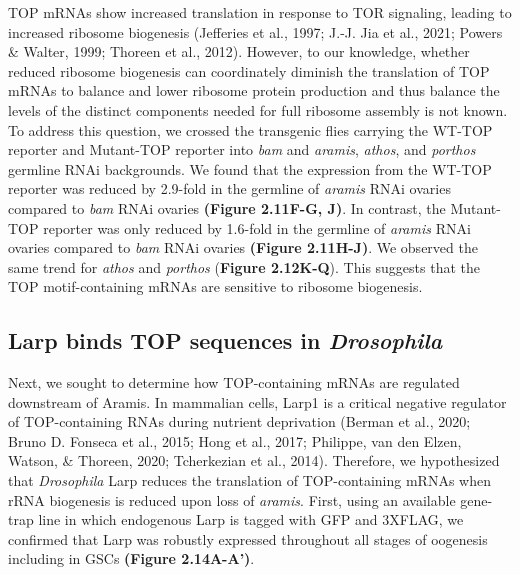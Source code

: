 \documentclass[12pt,oneside]{reedthesis}
\begin{document}
TOP mRNAs show increased translation in response to TOR signaling,
leading to increased ribosome biogenesis
(Jefferies et al., 1997; J.-J. Jia et al., 2021; Powers \& Walter, 1999; Thoreen et al., 2012). However, to our knowledge,
whether reduced ribosome biogenesis can coordinately diminish the
translation of TOP mRNAs to balance and lower ribosome protein
production and thus balance the levels of the distinct components needed
for full ribosome assembly is not known. To address this question, we
crossed the transgenic flies carrying the WT-TOP reporter and Mutant-TOP
reporter into \emph{bam} and \emph{aramis}, \emph{athos}, and \emph{porthos} germline RNAi
backgrounds. We found that the expression from the WT-TOP reporter was
reduced by 2.9-fold in the germline of \emph{aramis} RNAi ovaries compared to
\emph{bam} RNAi ovaries \textbf{(Figure 2.11F-G, J)}. In contrast, the Mutant-TOP
reporter was only reduced by 1.6-fold in the germline of \emph{aramis} RNAi
ovaries compared to \emph{bam} RNAi ovaries \textbf{(Figure 2.11H-J)}. We observed
the same trend for \emph{athos} and \emph{porthos} (\textbf{Figure 2.12K-Q}). This
suggests that the TOP motif-containing mRNAs are sensitive to ribosome
biogenesis.

\hypertarget{larp-binds-top-sequences-in-drosophila}{%
\subsection{\texorpdfstring{Larp binds TOP sequences in \emph{Drosophila}}{Larp binds TOP sequences in Drosophila}}\label{larp-binds-top-sequences-in-drosophila}}

Next, we sought to determine how TOP-containing mRNAs are regulated
downstream of Aramis. In mammalian cells, Larp1 is a critical negative
regulator of TOP-containing RNAs during nutrient deprivation
(Berman et al., 2020; Bruno D. Fonseca et al., 2015; Hong et al., 2017; Philippe, van den Elzen, Watson, \& Thoreen, 2020; Tcherkezian et al., 2014). Therefore, we
hypothesized that \emph{Drosophila} Larp reduces the translation of
TOP-containing mRNAs when rRNA biogenesis is reduced upon loss of
\emph{aramis}. First, using an available gene-trap line in which endogenous
Larp is tagged with GFP and 3XFLAG, we confirmed that Larp was robustly
expressed throughout all stages of oogenesis including in GSCs \textbf{(Figure 2.14A-A')}.
\end{document}
